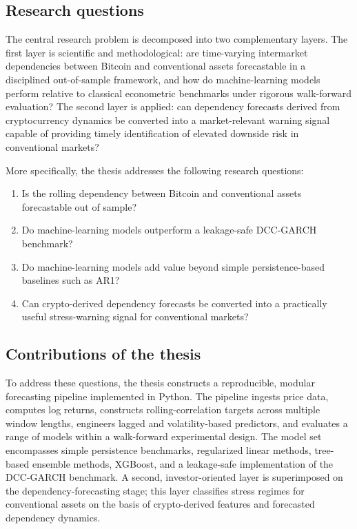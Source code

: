 \subsection{Research questions}

The central research problem is decomposed into two complementary layers. The first layer is scientific and methodological: are time-varying intermarket dependencies between Bitcoin and conventional assets forecastable in a disciplined out-of-sample framework, and how do machine-learning models perform relative to classical econometric benchmarks under rigorous walk-forward evaluation? The second layer is applied: can dependency forecasts derived from cryptocurrency dynamics be converted into a market-relevant warning signal capable of providing timely identification of elevated downside risk in conventional markets?

More specifically, the thesis addresses the following research questions:

\begin{enumerate}
    \item Is the rolling dependency between Bitcoin and conventional assets forecastable out of sample?
    \item Do machine-learning models outperform a leakage-safe DCC-GARCH benchmark?
    \item Do machine-learning models add value beyond simple persistence-based baselines such as AR1?
    \item Can crypto-derived dependency forecasts be converted into a practically useful stress-warning signal for conventional markets?
\end{enumerate}

\subsection{Contributions of the thesis}

To address these questions, the thesis constructs a reproducible, modular forecasting pipeline implemented in Python. The pipeline ingests price data, computes log returns, constructs rolling-correlation targets across multiple window lengths, engineers lagged and volatility-based predictors, and evaluates a range of models within a walk-forward experimental design. The model set encompasses simple persistence benchmarks, regularized linear methods, tree-based ensemble methods, XGBoost, and a leakage-safe implementation of the DCC-GARCH benchmark. A second, investor-oriented layer is superimposed on the dependency-forecasting stage; this layer classifies stress regimes for conventional assets on the basis of crypto-derived features and forecasted dependency dynamics.

